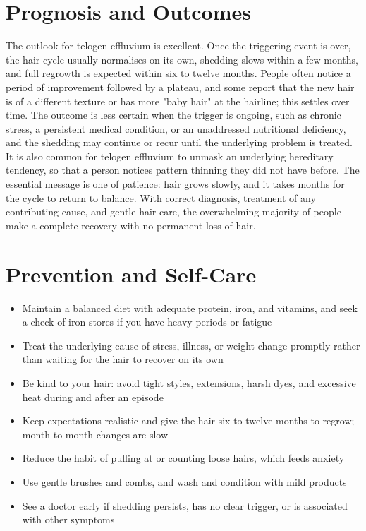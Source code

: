 \section*{Prognosis and Outcomes}
The outlook for telogen effluvium is excellent. Once the triggering event is over, the hair cycle usually normalises on its own, shedding slows within a few months, and full regrowth is expected within six to twelve months. People often notice a period of improvement followed by a plateau, and some report that the new hair is of a different texture or has more "baby hair" at the hairline; this settles over time. The outcome is less certain when the trigger is ongoing, such as chronic stress, a persistent medical condition, or an unaddressed nutritional deficiency, and the shedding may continue or recur until the underlying problem is treated. It is also common for telogen effluvium to unmask an underlying hereditary tendency, so that a person notices pattern thinning they did not have before. The essential message is one of patience: hair grows slowly, and it takes months for the cycle to return to balance. With correct diagnosis, treatment of any contributing cause, and gentle hair care, the overwhelming majority of people make a complete recovery with no permanent loss of hair.

\section*{Prevention and Self-Care}
\begin{itemize}
    \item Maintain a balanced diet with adequate protein, iron, and vitamins, and seek a check of iron stores if you have heavy periods or fatigue
    \item Treat the underlying cause of stress, illness, or weight change promptly rather than waiting for the hair to recover on its own
    \item Be kind to your hair: avoid tight styles, extensions, harsh dyes, and excessive heat during and after an episode
    \item Keep expectations realistic and give the hair six to twelve months to regrow; month-to-month changes are slow
    \item Reduce the habit of pulling at or counting loose hairs, which feeds anxiety
    \item Use gentle brushes and combs, and wash and condition with mild products
    \item See a doctor early if shedding persists, has no clear trigger, or is associated with other symptoms
\end{itemize}


